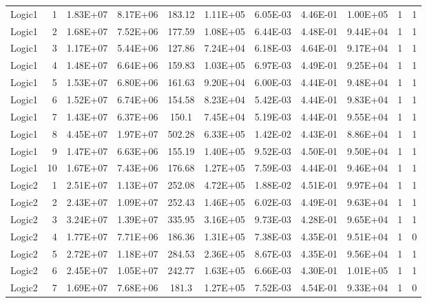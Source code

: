 \begin{longtable}{@{}l!{\vrule}r!{\vrule}c!{\vrule}c!{\vrule}c!{\vrule}c!{\vrule}c!{\vrule}c!{\vrule}c!{\vrule}c!{\vrule}c@{}}
\hline
\endlastfoot
{}
Logic1 & 1 & 1.83E+07 & 8.17E+06 & 183.12 & 1.11E+05 & 6.05E-03 & 4.46E-01 & 1.00E+05 & 1 & 1 \\
Logic1 & 2 & 1.68E+07 & 7.52E+06 & 177.59 & 1.08E+05 & 6.44E-03 & 4.48E-01 & 9.44E+04 & 1 & 1 \\
Logic1 & 3 & 1.17E+07 & 5.44E+06 & 127.86 & 7.24E+04 & 6.18E-03 & 4.64E-01 & 9.17E+04 & 1 & 1 \\
Logic1 & 4 & 1.48E+07 & 6.64E+06 & 159.83 & 1.03E+05 & 6.97E-03 & 4.49E-01 & 9.25E+04 & 1 & 1 \\
Logic1 & 5 & 1.53E+07 & 6.80E+06 & 161.63 & 9.20E+04 & 6.00E-03 & 4.44E-01 & 9.48E+04 & 1 & 1 \\
Logic1 & 6 & 1.52E+07 & 6.74E+06 & 154.58 & 8.23E+04 & 5.42E-03 & 4.44E-01 & 9.83E+04 & 1 & 1 \\
Logic1 & 7 & 1.43E+07 & 6.37E+06 & 150.1 & 7.45E+04 & 5.19E-03 & 4.44E-01 & 9.55E+04 & 1 & 1 \\
Logic1 & 8 & 4.45E+07 & 1.97E+07 & 502.28 & 6.33E+05 & 1.42E-02 & 4.43E-01 & 8.86E+04 & 1 & 1 \\
Logic1 & 9 & 1.47E+07 & 6.63E+06 & 155.19 & 1.40E+05 & 9.52E-03 & 4.50E-01 & 9.50E+04 & 1 & 1 \\
Logic1 & 10 & 1.67E+07 & 7.43E+06 & 176.68 & 1.27E+05 & 7.59E-03 & 4.44E-01 & 9.46E+04 & 1 & 1 \\
\hline
Logic2 & 1 & 2.51E+07 & 1.13E+07 & 252.08 & 4.72E+05 & 1.88E-02 & 4.51E-01 & 9.97E+04 & 1 & 1 \\
Logic2 & 2 & 2.43E+07 & 1.09E+07 & 252.43 & 1.46E+05 & 6.02E-03 & 4.49E-01 & 9.63E+04 & 1 & 1 \\
Logic2 & 3 & 3.24E+07 & 1.39E+07 & 335.95 & 3.16E+05 & 9.73E-03 & 4.28E-01 & 9.65E+04 & 1 & 1 \\
Logic2 & 4 & 1.77E+07 & 7.71E+06 & 186.36 & 1.31E+05 & 7.38E-03 & 4.35E-01 & 9.51E+04 & 1 & 0 \\
Logic2 & 5 & 2.72E+07 & 1.18E+07 & 284.53 & 2.36E+05 & 8.67E-03 & 4.35E-01 & 9.56E+04 & 1 & 1 \\
Logic2 & 6 & 2.45E+07 & 1.05E+07 & 242.77 & 1.63E+05 & 6.66E-03 & 4.30E-01 & 1.01E+05 & 1 & 1 \\
Logic2 & 7 & 1.69E+07 & 7.68E+06 & 181.3 & 1.27E+05 & 7.52E-03 & 4.54E-01 & 9.33E+04 & 1 & 0 \\

\end{longtable}
